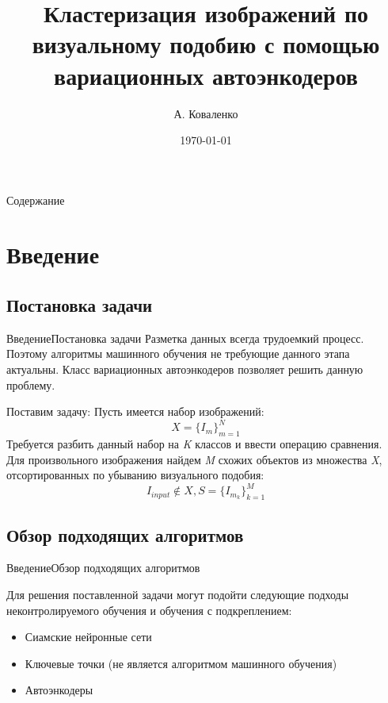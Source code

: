 \documentclass{beamer}
\title[Неконтролируемое обучение]{Кластеризация изображений по визуальному подобию с помощью вариационных автоэнкодеров}
\author{А. Коваленко}
\institute{ЮФУ}
\date{\today}
\begin{document}
\begin{frame}
  \titlepage
\end{frame}

\begin{frame}{Содержание}
  \tableofcontents
\end{frame}

\section{Введение}

\subsection{Постановка задачи}
\begin{frame}{Введение}{Постановка задачи}
Разметка данных всегда трудоемкий процесс. Поэтому алгоритмы машинного обучения не требующие данного этапа актуальны. Класс вариационных автоэнкодеров позволяет решить данную проблему.\\

\begin{block}{Поставим задачу:}
	Пусть имеется набор изображений: $$X = \{I_m\}_{m = 1}^{N}$$
	Требуется разбить данный набор на \textit{K} классов и ввести операцию сравнения.\\
	Для произвольного изображения найдем \textit{M} схожих объектов из множества \textit{X}, отсортированных по убыванию визуального подобия:
	$$I_{input} \notin X,  S = \{I_{m_k}\}_{k=1}^M$$
\end{block}

\end{frame}

\subsection{Обзор подходящих алгоритмов}



\begin{frame}{Введение}{Обзор подходящих алгоритмов}

Для решения поставленной задачи могут подойти следующие подходы неконтролируемого обучения и обучения с подкреплением:
\begin{itemize}
	\item Сиамские нейронные сети
	\item Ключевые точки (не является алгоритмом машинного обучения)
	\item Автоэнкодеры
\end{itemize}

\end{frame}
\end{document}
